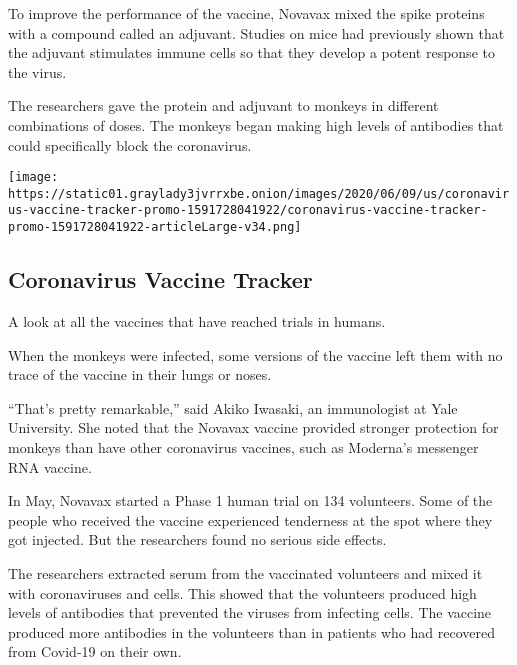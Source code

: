 To improve the performance of the vaccine, Novavax mixed the spike
proteins with a compound called an adjuvant. Studies on mice had
previously shown that the adjuvant stimulates immune cells so that they
develop a potent response to the virus.

The researchers gave the protein and adjuvant to monkeys in different
combinations of doses. The monkeys began making high levels of
antibodies that could specifically block the coronavirus.

\href{https://www.nytimes3xbfgragh.onion/interactive/2020/science/coronavirus-vaccine-tracker.html}{}

\texttt{[image: https://static01.graylady3jvrrxbe.onion/images/2020/06/09/us/coronavirus-vaccine-tracker-promo-1591728041922/coronavirus-vaccine-tracker-promo-1591728041922-articleLarge-v34.png]}

\hypertarget{coronavirus-vaccine-tracker}{%
\subsection{Coronavirus Vaccine
Tracker}\label{coronavirus-vaccine-tracker}}

A look at all the vaccines that have reached trials in humans.

When the monkeys were infected, some versions of the vaccine left them
with no trace of the vaccine in their lungs or noses.

``That's pretty remarkable,'' said Akiko Iwasaki, an immunologist at
Yale University. She noted that the Novavax vaccine provided stronger
protection for monkeys than have other coronavirus vaccines, such as
Moderna's messenger RNA vaccine.

In May, Novavax started a Phase 1 human trial on 134 volunteers. Some of
the people who received the vaccine experienced tenderness at the spot
where they got injected. But the researchers found no serious side
effects.

The researchers extracted serum from the vaccinated volunteers and mixed
it with coronaviruses and cells. This showed that the volunteers
produced high levels of antibodies that prevented the viruses from
infecting cells. The vaccine produced more antibodies in the volunteers
than in patients who had recovered from Covid-19 on their own.

\href{https://www.nytimes3xbfgragh.onion/news-event/coronavirus?action=click\&pgtype=Article\&state=default\&region=MAIN_CONTENT_3\&context=storylines_faq}{}

